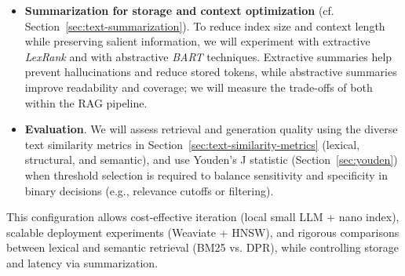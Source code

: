 \begin{itemize}
    \item \textbf{Summarization for storage and context optimization} (cf. Section~\ref{sec:text-summarization}). To reduce index size and context length while preserving salient information, we will experiment with extractive \emph{LexRank} and with abstractive \emph{BART} techniques. Extractive summaries help prevent hallucinations and reduce stored tokens, while abstractive summaries improve readability and coverage; we will measure the trade-offs of both within the \gls{RAG} pipeline.

    \item \textbf{Evaluation}. We will assess retrieval and generation quality using the diverse text similarity metrics in Section~\ref{sec:text-similarity-metrics} (lexical, structural, and semantic), and use Youden's J statistic (Section~\ref{sec:youden}) when threshold selection is required to balance sensitivity and specificity in binary decisions (e.g., relevance cutoffs or filtering).
\end{itemize}



This configuration allows cost-effective iteration (local small \gls{LLM} + nano index), scalable deployment experiments (Weaviate + HNSW), and rigorous comparisons between lexical and semantic retrieval (BM25 vs. DPR), while controlling storage and latency via summarization.






